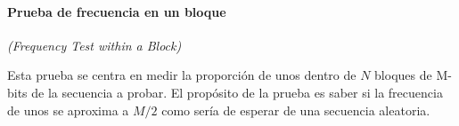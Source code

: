 


\paragraph{Prueba de frecuencia en un bloque} %
\textit{(Frequency Test within a Block)}

Esta prueba se centra en medir la proporción de unos dentro de $N$ bloques de 
M-bits de la secuencia a probar. El propósito de la prueba es saber si la 
frecuencia de unos se aproxima a $M/2$ como sería de esperar de una secuencia 
aleatoria.


